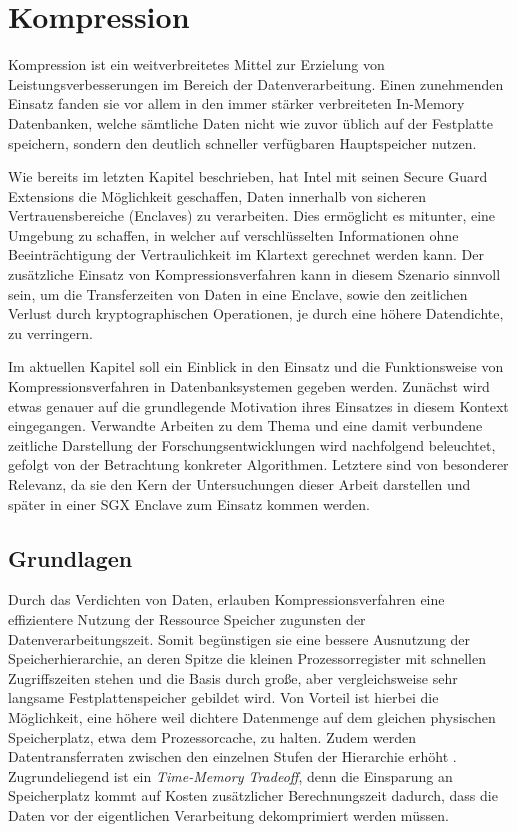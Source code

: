 
\chapter{Kompression}

Kompression ist ein weitverbreitetes Mittel zur Erzielung von Leistungsverbesserungen im Bereich der Datenverarbeitung. Einen zunehmenden Einsatz fanden sie vor allem in den immer stärker verbreiteten In-Memory Datenbanken, welche sämtliche Daten nicht wie zuvor üblich auf der Festplatte speichern, sondern den deutlich schneller verfügbaren Hauptspeicher nutzen.

Wie bereits im letzten Kapitel beschrieben, hat Intel mit seinen Secure Guard Extensions die Möglichkeit geschaffen, Daten innerhalb von sicheren Vertrauensbereiche (Enclaves) zu verarbeiten. Dies ermöglicht es mitunter, eine Umgebung zu schaffen, in welcher auf verschlüsselten Informationen ohne Beeinträchtigung der Vertraulichkeit im Klartext gerechnet werden kann. Der zusätzliche Einsatz von Kompressionsverfahren kann in diesem Szenario sinnvoll sein, um die Transferzeiten von Daten in eine Enclave, sowie den zeitlichen Verlust durch kryptographischen Operationen, je durch eine höhere Datendichte, zu verringern.

Im aktuellen Kapitel soll ein Einblick in den Einsatz und die Funktionsweise von Kompressionsverfahren in Datenbanksystemen gegeben werden. Zunächst wird etwas genauer auf die grundlegende Motivation ihres Einsatzes in diesem Kontext eingegangen. Verwandte Arbeiten zu dem Thema und eine damit verbundene zeitliche Darstellung der Forschungsentwicklungen wird nachfolgend beleuchtet, gefolgt von der Betrachtung konkreter Algorithmen. Letztere sind von besonderer Relevanz, da sie den Kern der Untersuchungen dieser Arbeit darstellen und später in einer SGX Enclave zum Einsatz kommen werden.

\section{Grundlagen} %

Durch das Verdichten von Daten, erlauben Kompressionsverfahren eine effizientere Nutzung der Ressource Speicher zugunsten der Datenverarbeitungszeit. Somit begünstigen sie eine bessere Ausnutzung der Speicherhierarchie, an deren Spitze die kleinen Prozessorregister mit schnellen Zugriffszeiten stehen und die Basis durch große, aber vergleichsweise sehr langsame Festplattenspeicher gebildet wird. Von Vorteil ist hierbei die Möglichkeit, eine höhere weil dichtere Datenmenge auf dem gleichen physischen Speicherplatz, etwa dem Prozessorcache, zu halten. Zudem werden Datentransferraten zwischen den einzelnen Stufen der Hierarchie erhöht \cite{Croft2009}. Zugrundeliegend ist ein \textit{Time-Memory Tradeoff}, denn die Einsparung an Speicherplatz kommt auf Kosten zusätzlicher Berechnungszeit dadurch, dass die Daten vor der eigentlichen Verarbeitung dekomprimiert werden müssen.

